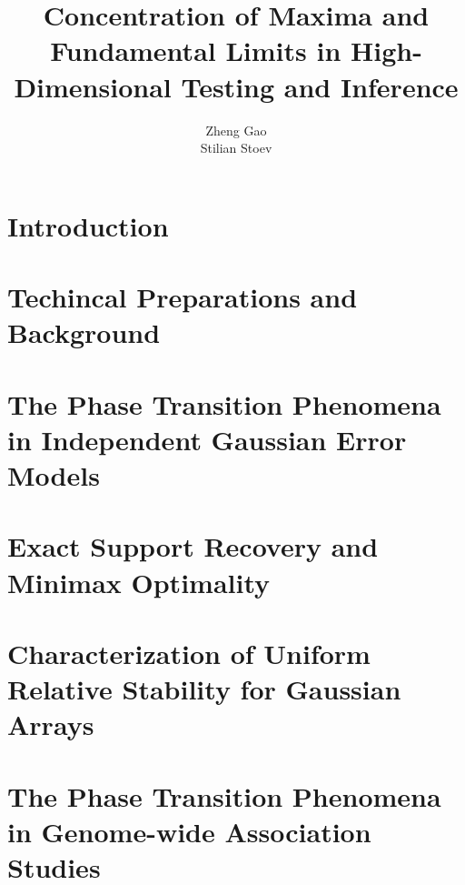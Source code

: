 \documentclass[thesis]{./tex/thesis-umich}
\title{Concentration of Maxima and Fundamental Limits in High-Dimensional  Testing and Inference}
\author{Zheng Gao\\Stilian Stoev}
\numberwithin{equation}{chapter}
\theoremstyle{plain}
\theoremstyle{definition}
\theoremstyle{remark}
\begin{document}
\chapter{Introduction}
\label{chap:intro}


\chapter{Techincal Preparations and Background}
\label{chap:background}



\chapter{The Phase Transition Phenomena in Independent Gaussian Error Models} 
\label{chap:phase-transitions}



\chapter{Exact Support Recovery and Minimax Optimality} 
\label{chap:exact-support-recovery}


\chapter{Characterization of Uniform Relative Stability for Gaussian Arrays}
\label{chap:URS}



\chapter{The Phase Transition Phenomena in Genome-wide Association Studies} 
\label{chap:GWAS}



% 



\end{document}
